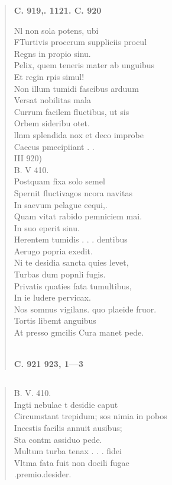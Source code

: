 \documentclass[11pt, a4paper]{report}
\begin{document}
\begin{verse}
     \marginpar{[346]} \begin{center} \textbf{C. 919,. 1121. C. 920} \end{center}Nl non sola potens, ubi \\ FTurtivis procerum suppliciis procul \\ Regns in propio sinu. \\ Pelix, quem teneris mater ab unguibus \\ Et regin rpis simul! \\ Non illum  \lbrack tumidi \rbrack  fascibus arduum \\ Versat nobilitas mala \\ Currum facilem fluctibus, ut sis \\ Orbem sideribu otet. \\ llnm splendida nox et deco improbe \\ Caecus pmecipiiant . . \\ III 920) \\ B. V 410. \\ Postquam fixa solo semel \\ Spernit fluctivagos ncora navitas \\ In saevum pelague eequi,. \\ Quam vitat rabido pemniciem mai. \\ In suo eperit sinu. \\ Herentem tumidis . . . dentibus \\ Aerugo popria exedit. \\ Ni te desidia sancta quies levet, \\ Turbas dum popnli fugis. \\ Privatis quaties fata tumultibus, \\ In ie ludere pervicax. \\ Nos somnus vigilans.  \lbrack quo plaeide \rbrack  fruor. \\ Tortis libemt anguibus \\ At presso gmcilis Cura manet pede. \\ 
        ﻿\pagebreak 
    \begin{center} \textbf{C. 921 923, 1—3} \end{center}
      \end{verse}
  
            \subsection*{}
      \begin{verse}
      B. V. 410. \\ Ingti nebulae t desidie caput \\ Circumstant trepidum; sos nimia in pobos \\ Incestis facilis annuit ausibus; \\ Sta contm assiduo pede. \\ Multum turba tenax . . . fidei \\ Vltma fata fuit non docili fugae \\ .premio.desider. \\ 
      \end{verse}
  
\end{document}
